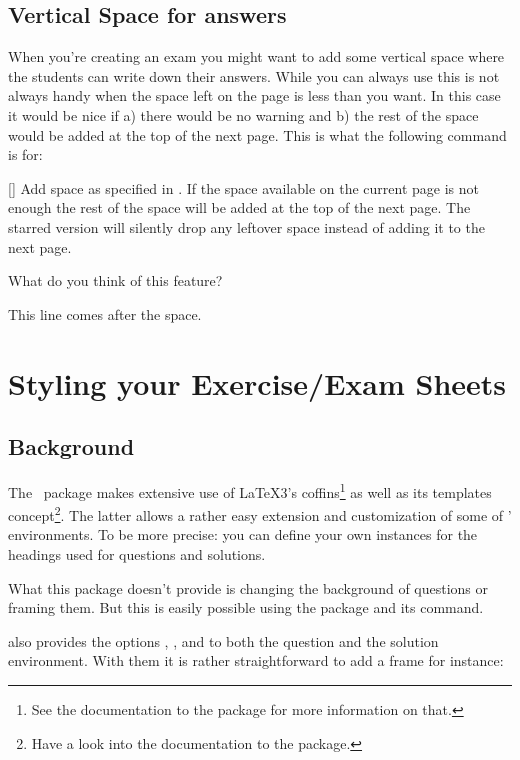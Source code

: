 \documentclass[load-preamble+]{cnltx-doc}
\begin{document}
\subsection{Vertical Space for answers}
When you're creating an exam you might want to add some
vertical space where the students can write down their answers.  While you can
always use  this is not always handy when the space left on the
page is less than you want.  In this case it would be nice if a) there would
be no warning and b) the rest of the space would be added at the top of the
next page.  This is what the following command is for:
\begin{commands}
  [\sarg{}]
    Add space as specified in . If the space available on the
    current page is not enough the rest of the space will be added at the top
    of the next page.  The starred version will silently drop any leftover
    space instead of adding it to the next page.
\end{commands}
\begin{example}
  \begin{question}
   What do you think of this feature?
   \examspace{3cm}
  \end{question}
  This line comes after the space.
\end{example}

\section{Styling your Exercise/Exam Sheets}\label{part:style}
\subsection{Background}
The \ExSheets\ package makes extensive use of \LaTeX3's coffins\footnote{See
  the documentation to the  package for more information on
  that.} as well as its templates concept\footnote{Have a look into the
  documentation to the  package.}.  The latter allows a
rather easy extension and customization of some of \ExSheets' environments.
To be more precise: you can define your own instances for the headings used
for questions and solutions.

What this package doesn't provide is changing the background of questions or
framing them.  But this is easily possible using the  package
and its  command.

\ExSheets{} also provides the options , ,
 and  to both the question and
the solution environment.  With them it is rather straightforward to add a
 frame for instance:
\begin{sourcecode}
\end{sourcecode}
\end{document}
